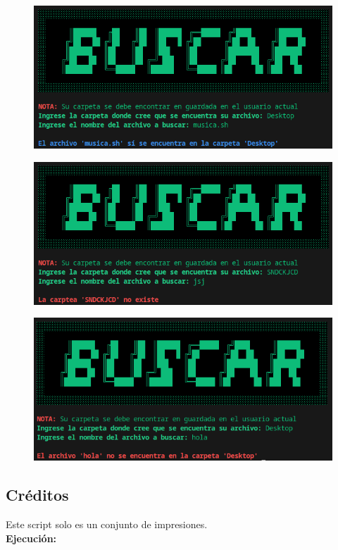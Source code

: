 \documentclass[letter,12pt]{article} %
\begin{document}
\begin{figure}[H]
	\centering
	\includegraphics[scale=0.65]{imagenes/buscar1.png}
\end{figure}
\begin{figure}[H]
	\centering
	\includegraphics[scale=0.65]{imagenes/buscar2.png}
\end{figure}
\begin{figure}[H]
	\centering
	\includegraphics[scale=0.65]{imagenes/buscar3.png}
\end{figure}

\subsection{Créditos}
Este script solo es un conjunto de impresiones.\\
\textbf{Ejecución:} \par
\end{document}
